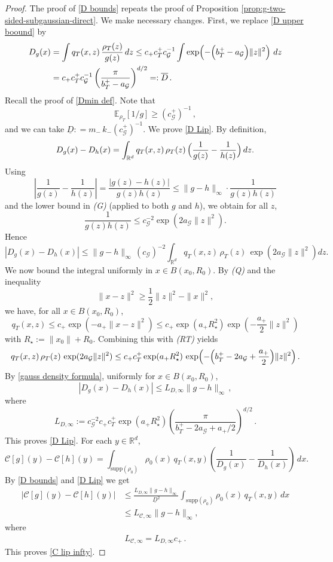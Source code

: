 \documentclass[11pt]{article}
\theoremstyle{remark}
\numberwithin{equation}{section}
\newcommand{\R}{\mathbb{R}}
\newcommand{\E}{\mathbb{E}}
\def\amax{a_{+}}
\def\bmax{b_T^{+}}
\def\cmax{c_{+}}
\def\cTmax{c_T^{+}}
\def\aGmin{a_{\mathcal{G}}}
\def\cGmin{c_{\mathcal{G}}}
\def\cGmax{c_{\mathcal{G}}^{+}}
\begin{document}
\begin{proof}
The proof of \eqref{D bounds} repeats the proof of Proposition \ref{prop:g-two-sided-subgaussian-direct}. We make necessary changes. First, we replace \eqref{D upper boound} by
\begin{align*}
  D_{g}(x)
  &=
  \int q_T(x,z)\,\frac{\rho_T(z)}{g(z)}\,dz
  \le
  \cmax \cTmax \cGmin^{-1}\int 
  \exp\!\left(-\Bigl(\bmax- \aGmin\Bigr)\|z\|^2\right)\,dz
  \\
  & =
  \cmax \cTmax  \cGmin^{-1} \left(\frac{\pi}{\bmax- \aGmin}\right)^{d/2} = : \overline{D}\, .
\end{align*}
Recall the proof of \eqref{Dmin def}. Note that
$$
\E_{\rho_T}[1/g] \geq (\cGmax)^{-1}\,, 
$$
and we can take $\underline{D}: = m_-\,k_- (\cGmax)^{-1}$. 
We prove \eqref{D Lip}. By definition,
\[
  D_g(x)-D_h(x)
  =
  \int_{\mathbb{R}^d} q_T(x,z)\,\rho_T(z)\,
  \Bigl(\frac{1}{g(z)}-\frac{1}{h(z)}\Bigr)\,dz.
\]
Using
\[
  \left|\frac{1}{g(z)}-\frac{1}{h(z)}\right|
  =
  \frac{|g(z)-h(z)|}{g(z)h(z)}
  \le
  \|g-h\|_\infty\cdot \frac{1}{g(z)h(z)}
\]
and the lower bound in \emph{(G)} (applied to both $g$ and $h$),
we obtain for all $z$,
\[
  \frac{1}{g(z)h(z)}
  \le
  \cGmin^{-2}\exp(2 \aGmin \|z\|^2).
\]
Hence
\begin{equation}\label{eq:Dg-Dh-basic}
  |D_g(x)-D_h(x)|
  \le
  \|g-h\|_\infty\,
  (\cGmin)^{-2}
  \int_{\mathbb{R}^d}
    q_T(x,z)\,\rho_T(z)\,\exp(2 \aGmin \|z\|^2) dz.
\end{equation}
We now bound the integral uniformly in $x\in B(x_0, R_0)$. By \emph{(Q)} and the inequality
\[
  \|x-z\|^2 \ge \frac{1}{2}\|z\|^2 - \|x\|^2,
\]
we have, for all $x\in B(x_0, R_0)$,
\[
  q_T(x,z)
  \le
  \cmax \exp(-\amax\|x-z\|^2)
  \le \cmax \exp(\amax R_\star^2)\exp\!\left(-\frac{\amax}{2}\|z\|^2\right)
\]
with $R_\star:=\|x_0\|+R_0.$
Combining this with \emph{(RT)} yields
\[
  q_T(x,z)\,\rho_T(z)\,\exp(2 \aGmin \|z\|^2)
  \le
  \cmax
  \cTmax \exp(\amax R_\star^2)\,
  \exp\!\left(-\Bigl(\bmax- 2 \aGmin +\frac{\amax}{2}\Bigr)\|z\|^2\right).
\]
By \eqref{gauss density formula}, uniformly for $x\in B(x_0, R_0)$,
\[
  |D_g(x)-D_h(x)|
  \le
  L_{D,\infty} \|g-h\|_\infty \, ,
\]
where 
\begin{equation}
\label{LD definition}
L_{D,\infty}
  :=
  \cGmin^{-2}
  \cmax
  \cTmax \exp(\amax R_\star^2) 
  \left(\frac{\pi}{\bmax- 2 \aGmin +\amax/2}\right)^{d/2}\, .
\end{equation}
This proves \eqref{D Lip}. For each $y \in \R^d$,
\[
  \mathcal C[g](y)-\mathcal C[h](y)
  =
  \int_{\mathrm{supp}(\rho_0)}\rho_0(x)\,q_T(x,y)
  \left(\frac{1}{D_g(x)}-\frac{1}{D_h(x)}\right)\,dx.
\]
By \eqref{D bounds} and \eqref{D Lip} we get 
\begin{align*}
  |\mathcal C[g](y)-\mathcal C[h](y)|
  & \le
  \frac{L_{D,\infty} \|g-h\|_\infty}{\underline D^2}
  \int_{\mathrm{supp}(\rho_0)}\rho_0(x)\,q_T(x,y)\,dx \\
  & \le L_{\mathcal C, \infty} \|g-h\|_\infty, 
\end{align*}
where 
\begin{eqnarray}
\label{CD definition}
    L_{\mathcal C, \infty} = L_{D,\infty} \cmax \, .
\end{eqnarray}
This proves \eqref{C lip infty}. 


\end{proof}
\end{document}
